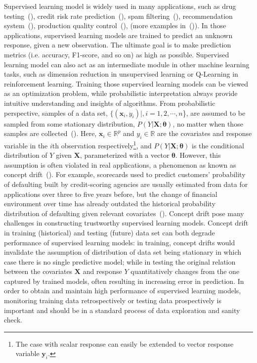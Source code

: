 \documentclass[twoside,11pt]{article}
\begin{document}
Supervised learning model is widely used in many applications, {such as} drug testing~(\cite{fong2015change}), credit risk rate prediction~(\cite{im2012time}), spam filtering~(\cite{carmona2010gnusmail}), recommendation system~(\cite{koren2009collaborative}), production quality control~(\cite{bui2018monitoring}), {(more examples in~(\cite{vzliobaite2016overview}))}. In those applications, supervised learning models are trained to predict an unknown response, given a new observation. The ultimate goal is to make prediction metrics (i.e. accuracy, F1-score, and so on) as high as possible. Supervised learning model can also act as an intermediate module in other machine learning tasks, such as dimension reduction in unsupervised learning or Q-Learning in reinforcement learning. Training those supervised learning models can be viewed as an optimization problem, while probabilistic interpretation always provide intuitive understanding and insights of algorithms. From probabilistic perspective, samples of a data set, {$\{ (\bm {x}_i, y_i)|, i=1,2,\cdots,n$\}}, are assumed to be sampled from some stationary distribution, $P (Y| \bm {X};\bm{\theta})$, no matter when those samples are collected~(\cite{hulten2001mining}). Here, {$\bm {x}_i \in \mathbb{R}^{p}$ and $y_i \in \mathbb{R}$ are the covariates and response variable in the $i$th observation respectively}\footnote{The case with scalar response can easily be extended to vector response variable $\bm {y}_i$.}, and $P (Y| \bm {X};\bm{\theta})$ is the conditional distribution of $Y$ given $\bm{X}$, parameterized with a vector $\bm{\theta}$. However, this assumption is often violated in real applications, a phenomenon as known as concept drift~(\cite{moreno2012unifying}). For example, scorecards used to predict customers' probability of defaulting built by credit-scoring agencies are usually estimated from data for applications over three to five years before, but the change of financial environment over time has already outdated the historical probability distribution of defaulting given relevant covariates~(\cite{crook1992degradation,vzliobaite2016overview}). Concept drift pose many challenges in constructing trustworthy supervised learning models. Concept drift in training (historical) and testing (future) data set can both degrade performance of supervised learning models: in training, concept drifts would invalidate the assumption of distribution of data set being stationary in which case there is no single predictive model; while in testing the original relation between the covariates $\bm{X}$ and response $Y$ quantitatively changes from the one captured by trained models, often resulting in increasing error in prediction. In order to obtain and maintain high performance of supervised learning models, monitoring training data retrospectively or testing data prospectively is important and should be in a standard process of data exploration and sanity check.
\end{document}
